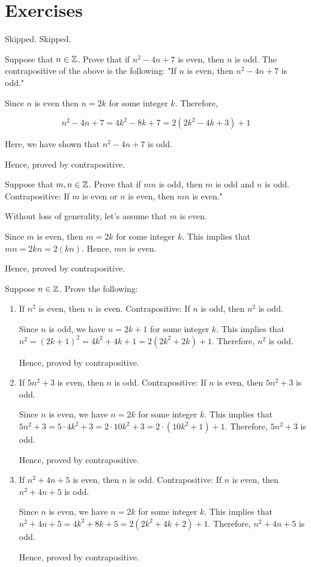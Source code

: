 \section*{Exercises}

\bp Skipped. \ep
\bp Skipped. \ep

\bp Suppose that $n \in \mathbb{Z}$. Prove that if $n^2 - 4n + 7$ is even, then $n$ is odd. \ep
\bs
The contrapositive of the above is the following: "If $n$ is even, then $n^2 - 4n + 7$ is odd."

Since $n$ is even then $n = 2k$ for some integer $k$. Therefore, 

$$n^2 - 4n + 7 = 4k^2 - 8k + 7 = 2(2k^2 - 4k + 3) + 1$$

Here, we have shown that $n^2 - 4n + 7$ is odd.

Hence, proved by contrapositive.
\es


\bp Suppose that $m, n \in \mathbb{Z}$. Prove that if $mn$ is odd, then $m$ is odd and $n$ is odd. \ep
\bs
Contrapositive: If $m$ is even or $n$ is even, then $mn$ is even."

Without loss of generality, let's assume that $m$ is even.

Since $m$ is even, then $m = 2k$ for some integer $k$. This implies that $mn = 2kn = 2(kn)$. Hence, $mn$ is even.

Hence, proved by contrapositive.
\es

\bp Suppose $n \in \mathbb{Z}$. Prove the following:
\begin{enumerate}
	\item If $n^2$ is even, then $n$ is even.
		\bs
		Contrapositive: If $n$ is odd, then $n^2$ is odd.

		Since $n$ is odd, we have $n = 2k+1$ for some integer $k$.
		This implies that $n^2 = (2k+1)^2 = 4k^2 + 4k + 1 = 2(2k^2+2k)+1$.
		Therefore, $n^2$ is odd.

		Hence, proved by contrapositive.
		\es

	\item If $5n^2 + 3$ is even, then $n$ is odd.
		\bs
		Contrapositive: If $n$ is even, then $5n^2+3$ is odd.

		Since $n$ is even, we have $n = 2k$ for some integer $k$. 
		This implies that 
		$5n^2 + 3 = 5 \cdot 4k^2 + 3 = 2 \cdot 10k^2 + 3 = 2 \cdot ( 10k^2 + 1 ) + 1$.
		Therefore, $5n^2+3$ is odd.

		Hence, proved by contrapositive.
		\es

	\item If $n^2+4n+5$ is even, then $n$ is odd.
		\bs
		Contrapositive: If $n$ is even, then $n^2+4n+5$ is odd.

		Since $n$ is even, we have $n=2k$ for some integer $k$.
		This implies that $n^2 + 4n + 5 = 4k^2 + 8k + 5 = 2(2k^2 + 4k + 2) + 1$.
		Therefore, $n^2 + 4n + 5$ is odd.

		Hence, proved by contrapositive.
		\es
\end{enumerate}
\ep

